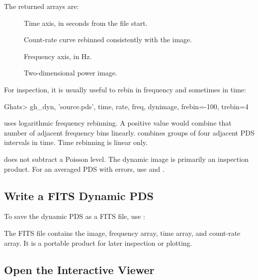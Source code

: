 The returned arrays are:

\begin{description}
\item[] Time axis, in seconds from the file start.
\item[] Count-rate curve rebinned consistently with the image.
\item[] Frequency axis, in Hz.
\item[] Two-dimensional power image.
\end{description}

For inspection, it is usually useful to rebin in frequency and sometimes in
time:

\begin{ghatsconsole}
Ghats> gh_dyn, 'source.pds', time, rate, freq, dynimage, frebin=-100, trebin=4
\end{ghatsconsole}

 uses logarithmic frequency rebinning.  A positive
 value would combine that number of adjacent frequency bins
linearly.   combines groups of four adjacent PDS intervals in
time.  Time rebinning is linear only.

\begin{ghatsnote}
 does not subtract a Poisson level.  The dynamic image is
primarily an inspection product.  For an averaged PDS with errors, use
 and .
\end{ghatsnote}

\subsection*{Write a FITS Dynamic PDS}

To save the dynamic PDS as a FITS file, use :


The FITS file contains the image, frequency array, time array, and count-rate
array.  It is a portable product for later inspection or plotting.

\subsection*{Open the Interactive Viewer}

